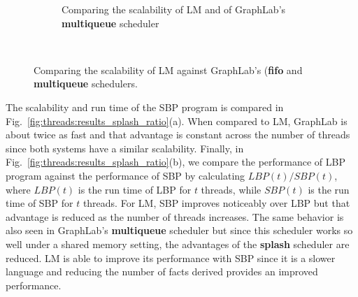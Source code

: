 \begin{figure}[]
\begin{subfigure}[b]{\plotsize\textwidth}
           \caption{Comparing the scalability of LM and of GraphLab's
              \textbf{multiqueue} scheduler}
           \label{fig:threads:splash_multi}
        \end{subfigure} \\
        \caption{Comparing the scalability of LM against GraphLab's (\textbf{fifo}
        and \textbf{multiqueue} schedulers.}
        \label{fig:threads:results_splash}
\end{figure}

The scalability and run time of the SBP program is compared in
Fig.~\ref{fig:threads:results_splash_ratio}(a). When compared to LM, GraphLab is
about twice as fast and that advantage is constant across the number of threads
since both systems have a similar scalability. Finally, in
Fig.~\ref{fig:threads:results_splash_ratio}(b), we compare the performance of
LBP program against the performance of SBP by calculating $LBP(t)/SBP(t)$, where
$LBP(t)$ is the run time of LBP for $t$ threads, while $SBP(t)$ is the run time
of SBP for $t$ threads. For LM, SBP improves noticeably over LBP but that
advantage is reduced as the number of threads increases. The same behavior is
also seen in GraphLab's \textbf{multiqueue} scheduler but since this scheduler
works so well under a shared memory setting, the advantages of the
\textbf{splash} scheduler are reduced. LM is able to improve its performance
with SBP since it is a slower language and reducing the number of facts derived
provides an improved performance.

\begin{figure}[]
        \centering
\end{figure}

